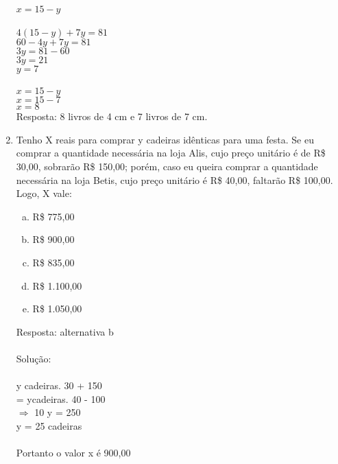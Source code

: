 \documentclass[a4paper,14pt]{article}
\begin{document}
\begin{multicols}{2}
\begin{enumerate}
        $x = 15 - y $ \\\\
        $4(15 - y) + 7y = 81$ \\
        $60 - 4y + 7y = 81$ \\
        $3y = 81 - 60$ \\
        $3y = 21$ \\
        $y = 7$ \\\\
        $x = 15  - y$ \\
        $x = 15 - 7$ \\
        $x = 8$ \\
        Resposta: 8 livros de 4 cm e 7 livros de 7 cm.
        
        \item Tenho X reais para comprar y cadeiras idênticas para uma festa. Se eu comprar a quantidade necessária na loja Alis, cujo preço unitário é de R\$ 30,00, sobrarão R\$ 150,00; porém, caso eu queira comprar a quantidade necessária na loja Betis, cujo preço unitário é R\$ 40,00, faltarão R\$ 100,00. Logo, X vale:
        \begin{enumerate}[a)]
        	\item R\$ 775,00
        	\item R\$ 900,00
        	\item R\$ 835,00
        	\item R\$ 1.100,00
        	\item R\$ 1.050,00
        \end{enumerate}
        Resposta: alternativa b \\\\
        Solução: \\\\
        y cadeiras. 30 + 150 \\ 
        = ycadeiras. 40 - 100 \\ 
        $\Rightarrow$ 10 y = 250 \\ 
        y = 25 cadeiras \\\\
        Portanto o valor x é 900,00 \\\\

\end{enumerate}
\end{multicols}
\end{document}
